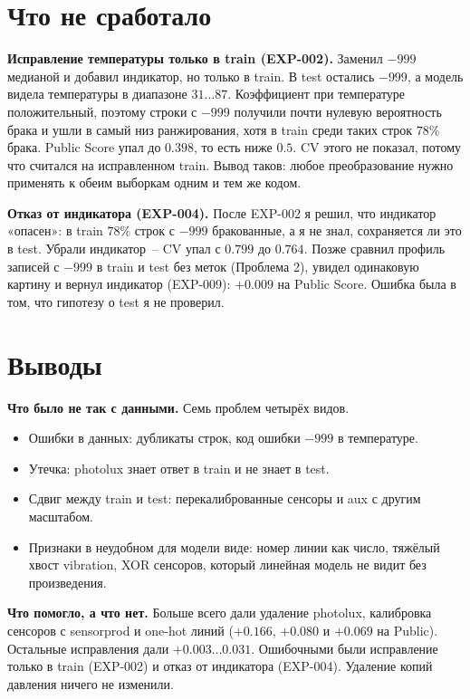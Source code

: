 \documentclass[11pt,a4paper,twocolumn]{article}
\newcommand{\f}[1]{{\ttfamily\def\_{\textunderscore\allowbreak}#1}}
\begin{document}
\section{Что не сработало}
\label{sec:failures}

\textbf{Исправление температуры только в train (EXP-002).} Заменил $-999$ медианой и добавил индикатор, но только в \f{train}. В \f{test} остались $-999$, а модель видела температуры в диапазоне $31 \dots 87$. Коэффициент при температуре положительный, поэтому строки с $-999$ получили почти нулевую вероятность брака и ушли в самый низ ранжирования, хотя в \f{train} среди таких строк $78\%$ брака. Public Score упал до $0.398$, то есть ниже $0.5$. CV этого не показал, потому что считался на исправленном \f{train}. Вывод таков: любое преобразование нужно применять к обеим выборкам одним и тем же кодом.

\textbf{Отказ от индикатора (EXP-004).} После EXP-002 я решил, что индикатор «опасен»: в \f{train} $78\%$ строк с $-999$ бракованные, а я не знал, сохраняется ли это в \f{test}. Убрали индикатор~-- CV упал с $0.799$ до $0.764$. Позже сравнил профиль записей с $-999$ в \f{train} и \f{test} без меток (Проблема 2), увидел одинаковую картину и вернул индикатор (EXP-009): $+0.009$ на Public Score. Ошибка была в том, что гипотезу о \f{test} я не проверил.

\section{Выводы}

\textbf{Что было не так с данными.} Семь проблем четырёх видов.
\begin{itemize}
    \item Ошибки в данных: дубликаты строк, код ошибки $-999$ в температуре.
    \item Утечка: \f{photo\_lux} знает ответ в \f{train} и не знает в \f{test}.
    \item Сдвиг между \f{train} и \f{test}: перекалиброванные сенсоры и \f{aux\_*} с другим масштабом.
    \item Признаки в неудобном для модели виде: номер линии как число, тяжёлый хвост \f{vibration}, XOR сенсоров, который линейная модель не видит без произведения.
\end{itemize}

\textbf{Что помогло, а что нет.} Больше всего дали удаление \f{photo\_lux}, калибровка сенсоров с \f{sensor\_prod} и one-hot линий ($+0.166$, $+0.080$ и $+0.069$ на Public). Остальные исправления дали $+0.003 \dots 0.031$. Ошибочными были исправление только в \f{train} (EXP-002) и отказ от индикатора (EXP-004). Удаление копий давления ничего не изменили.
\end{document}
